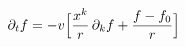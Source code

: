 \documentclass[preview]{standalone}
\begin{document}
\begin{align*}
\special{dvisvgm:raw <g id='unique000'>}\partial_t f = -v\Big[\frac{x^k}{r}\,\partial_k f + \frac{f-f_0}{r}\Big]\special{dvisvgm:raw </g>}
\end{align*}
\end{document}
